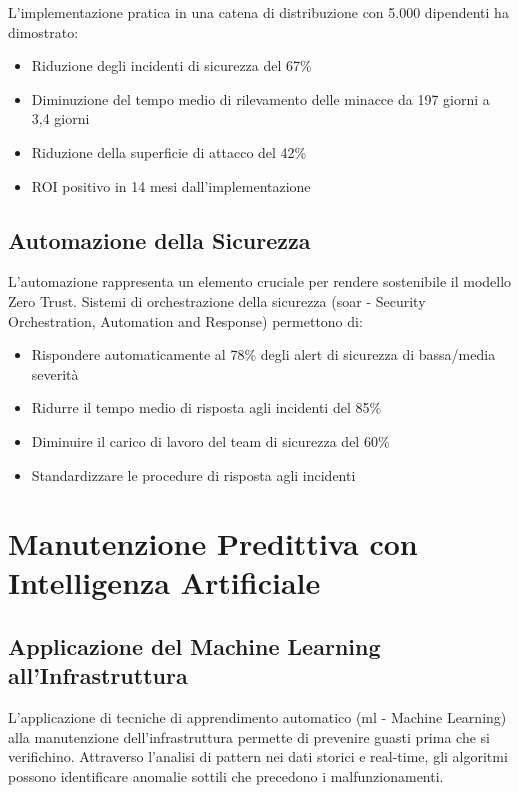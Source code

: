 L'implementazione pratica in una catena di distribuzione con 5.000 dipendenti ha dimostrato\autocite{Forrester2024zero}:
\begin{itemize}
    \item Riduzione degli incidenti di sicurezza del 67\%
    \item Diminuzione del tempo medio di rilevamento delle minacce da 197 giorni a 3,4 giorni
    \item Riduzione della superficie di attacco del 42\%
    \item ROI positivo in 14 mesi dall'implementazione
\end{itemize}

\subsection{Automazione della Sicurezza}
\label{subsec:security_automation}

L'automazione rappresenta un elemento cruciale per rendere sostenibile il modello Zero Trust. Sistemi di orchestrazione della sicurezza (\gls{soar} - Security Orchestration, Automation and Response) permettono di\autocite{Gartner2024security}:

\begin{itemize}
    \item Rispondere automaticamente al 78\% degli alert di sicurezza di bassa/media severità
    \item Ridurre il tempo medio di risposta agli incidenti del 85\%
    \item Diminuire il carico di lavoro del team di sicurezza del 60\%
    \item Standardizzare le procedure di risposta agli incidenti
\end{itemize}

\section{Manutenzione Predittiva con Intelligenza Artificiale}
\label{sec:manutenzione_predittiva}

\subsection{Applicazione del Machine Learning all'Infrastruttura}
\label{subsec:ml_infrastructure}

L'applicazione di tecniche di apprendimento automatico (\gls{ml} - Machine Learning) alla manutenzione dell'infrastruttura permette di prevenire guasti prima che si verifichino. Attraverso l'analisi di pattern nei dati storici e real-time, gli algoritmi possono identificare anomalie sottili che precedono i malfunzionamenti\autocite{IEEE2024ml}.

